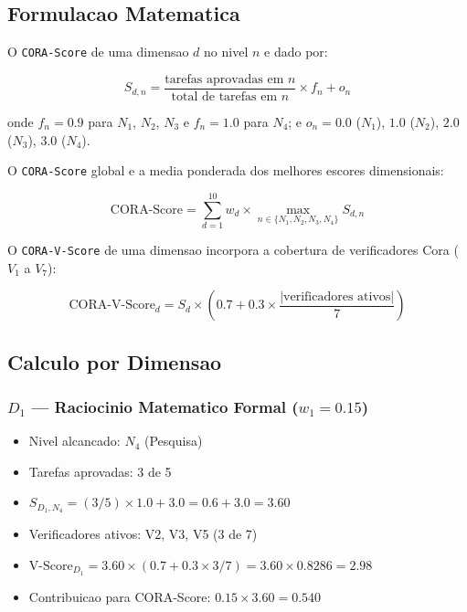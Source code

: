 \subsection{Formulacao Matematica}

O \texttt{CORA-Score} de uma dimensao $d$ no nivel $n$ e dado por:

\begin{equation}
S_{d,n} = \frac{\text{tarefas aprovadas em } n}{\text{total de tarefas em } n} \times f_{n} + o_{n}
\label{eq:cora_dim_score}
\end{equation}

onde $f_{n}=0.9$ para $N_1$, $N_2$, $N_3$ e $f_{n}=1.0$ para $N_4$; e $o_{n}=0.0$ ($N_1$), $1.0$ ($N_2$), $2.0$ ($N_3$), $3.0$ ($N_4$).

O \texttt{CORA-Score} global e a media ponderada dos melhores escores dimensionais:

\begin{equation}
\text{CORA-Score} = \sum_{d=1}^{10} w_{d} \times \max_{n\in\{N_1,N_2,N_3,N_4\}} S_{d,n}
\label{eq:cora_global}
\end{equation}

O \texttt{CORA-V-Score} de uma dimensao incorpora a cobertura de verificadores Cora ($V_1$ a $V_7$):

\begin{equation}
\text{CORA-V-Score}_{d} = S_{d} \times \left(0.7 + 0.3 \times \frac{|\text{verificadores ativos}|}{7}\right)
\label{eq:cora_v_score}
\end{equation}

\subsection{Calculo por Dimensao}

\subsubsection{$D_1$ --- Raciocinio Matematico Formal ($w_{1}=0.15$)}

\begin{itemize}
\item Nivel alcancado: $N_4$ (Pesquisa)
\item Tarefas aprovadas: 3 de 5
\item $S_{D_1,N_4} = (3/5) \times 1.0 + 3.0 = 0.6 + 3.0 = 3.60$
\item Verificadores ativos: V2, V3, V5 (3 de 7)
\item $\text{V-Score}_{D_1} = 3.60 \times (0.7 + 0.3 \times 3/7) = 3.60 \times 0.8286 = 2.98$
\item Contribuicao para CORA-Score: $0.15 \times 3.60 = 0.540$
\end{itemize}

